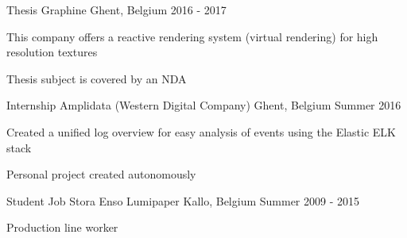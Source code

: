 \begin{cventries}
\cventry
{Thesis} %
{Graphine} %
{Ghent, Belgium} %
{2016 - 2017} %
{ %
\begin{cvitems}
\item {This company offers a reactive rendering system (virtual rendering) for high resolution textures}
\item {Thesis subject is covered by an NDA}
\end{cvitems}
}


\cventry
{Internship} %
{Amplidata (Western Digital Company)} %
{Ghent, Belgium} %
{Summer 2016} %
{ %
\begin{cvitems}
\item {Created a unified log overview for easy analysis of events using the Elastic ELK stack}
\item {Personal project created autonomously}
\end{cvitems}
}


\cventry
{Student Job} %
{Stora Enso Lumipaper} %
{Kallo, Belgium} %
{Summer 2009 - 2015} %
{ %
\begin{cvitems}
\item {Production line worker}
\end{cvitems}
}




\end{cventries}